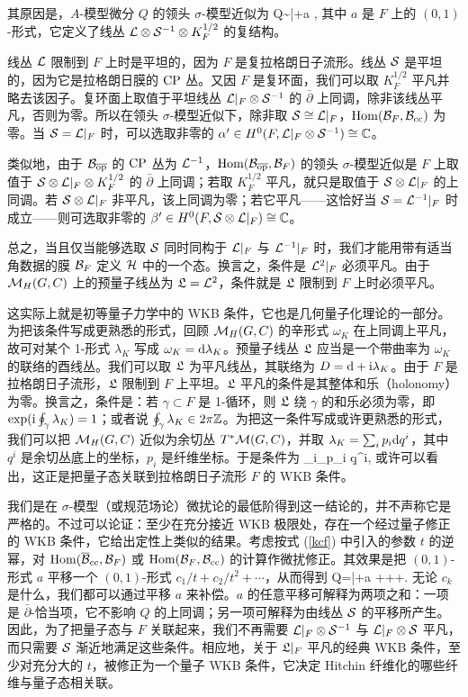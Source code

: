 其原因是，$A$-模型微分 $Q$ 的领头 $\sigma$-模型近似为
\be\label{jno}Q\sim \bar\partial+a , \ee
其中 $a$ 是 $F$ 上的 $(0,1)$-形式，它定义了线丛 $\L\otimes \S^{-1}\otimes K_F^{1/2}$ 的复结构。

线丛 $\L$ 限制到 $F$ 上时是平坦的，因为 $F$ 是复拉格朗日子流形。线丛 $\S$ 是平坦的，因为它是拉格朗日膜的 $\CP$ 丛。又因 $F$ 是复环面，我们可以取 $K_F^{1/2}$ 平凡并略去该因子。复环面上取值于平坦线丛 $\L|_F\otimes \S^{-1}$ 的 $\bar\partial$ 上同调，除非该线丛平凡，否则为零。所以在领头 $\sigma$-模型近似下，除非取 $\S\cong \L|_F$，$\Hom(\B_F,\B_\cc)$ 为零。当 $\S=\L|_F$ 时，可以选取非零的 $\alpha' \in H^0(F,\L|_F\otimes \S^{-1})\cong \C$。

类似地，由于 $\B_\bop$ 的 $\CP$ 丛为 $\L^{-1}$，$\Hom(\B_\bop,\B_F)$ 的领头 $\sigma$-模型近似是 $F$ 上取值于 $\S\otimes \L|_F\otimes K_F^{1/2}$ 的 $\bar\partial$ 上同调；若取 $K_F^{1/2}$ 平凡，就只是取值于 $\S\otimes \L|_F$ 的上同调。若 $\S\otimes \L|_F$ 非平凡，该上同调为零；若它平凡——这恰好当 $\S=\L^{-1}|_F$ 时成立——则可选取非零的 $\beta'\in H^0(F, \S\otimes\L|_F)\cong \C$。

总之，当且仅当能够选取 $\S$ 同时同构于 $\L|_F$ 与 $\L^{-1}|_F$ 时，我们才能用带有适当角数据的膜 $\B_F$ 定义 $\H$ 中的一个态。换言之，条件是 $\L^2|_F$ 必须平凡。由于 $\M_H(G,C)$ 上的预量子线丛为 $\frL=\L^2$，条件就是 $\frL$ 限制到 $F$ 上时必须平凡。

这实际上就是初等量子力学中的 WKB 条件，它也是几何量子化理论的一部分。为把该条件写成更熟悉的形式，回顾 $\M_H(G,C)$ 的辛形式 $\omega_K$ 在上同调上平凡，故可对某个 1-形式 $\lambda_K$ 写成 $\omega_K=\d\lambda_K$。预量子线丛 $\frL$ 应当是一个带曲率为 $\omega_K$ 的联络的酉线丛。我们可以取 $\frL$ 为平凡线丛，其联络为 $D=\d+\i\lambda_K$。由于 $F$ 是拉格朗日子流形，$\frL$ 限制到 $F$ 上平坦。$\frL$ 平凡的条件是其整体和乐（holonomy）为零。换言之，条件是：若 $\gamma\subset F$ 是 1-循环，则 $\frL$ 绕 $\gamma$ 的和乐必须为零，即 $\exp(\i \oint_\gamma\lambda_K)=1$；或者说 $\oint_\gamma \lambda_K\in 2\pi\Z$。为把这一条件写成或许更熟悉的形式，我们可以把 $\M_H(G,C)$ 近似为余切丛 $T^*\M(G,C)$，并取 $\lambda_K=\sum_i p_i\d q^i$，其中 $q^i$ 是余切丛底上的坐标，$p_i$ 是纤维坐标。于是条件为
 \be\label{weffo}\sum_i\oint_\gamma p_i \d q^i\pi \Z,\ee
 或许可以看出，这正是把量子态关联到拉格朗日子流形 $F$ 的 WKB 条件。

我们是在 $\sigma$-模型（或规范场论）微扰论的最低阶得到这一结论的，并不声称它是严格的。不过可以论证：至少在充分接近 WKB 极限处，存在一个经过量子修正的 WKB 条件，它给出定性上类似的结果。考虑按式 (\ref{kcf}) 中引入的参数 $t$ 的逆幂，对 $\Hom(\b\B_\cc,\B_F)$ 或 $\Hom(\B_F,\B_\cc)$ 的计算作微扰修正。其效果是把 $(0,1)$-形式 $a$ 平移一个 $(0,1)$-形式 $c_1/t+c_2/t^2+\cdots$，从而得到
 \be\label{zeflo}Q=\bar\partial+a +++\cdots .\ee
 无论 $c_k$ 是什么，我们都可以通过平移 $a$ 来补偿。$a$ 的任意平移可解释为两项之和：一项是 $\bar\partial$-恰当项，它不影响 $Q$ 的上同调；另一项可解释为由线丛 $\S$ 的平移所产生。因此，为了把量子态与 $F$ 关联起来，我们不再需要 $\L|_F\otimes \S^{-1}$ 与 $\L|_F\otimes \S$ 平凡，而只需要 $\S$ 渐近地满足这些条件。相应地，关于 $\frL|_F$ 平凡的经典 WKB 条件，至少对充分大的 $t$，被修正为一个量子 WKB 条件，它决定 Hitchin 纤维化的哪些纤维与量子态相关联。

